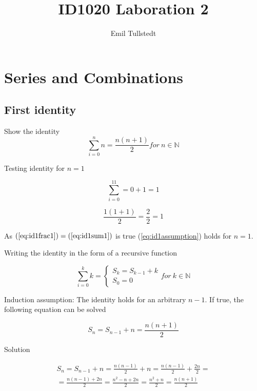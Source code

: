\documentclass[a4paper,11pt]{article}
\title{ID1020 Laboration 2}
\author{Emil Tullstedt}
\begin{document}
\maketitle

\newpage

\tableofcontents

\newpage

\section{Series and Combinations}
\label{sec:sac}

\subsection{First identity}

Show the identity
\begin{equation} \label{eq:id1assumption}
\sum_{i=0}^nn = \frac{n(n+1)}{2} for\ n \in \mathbb{N}
\end{equation}

Testing identity for $n = 1$

\begin{equation} \label{eq:id1sum1}
\sum_{i=0}^11 = 0 + 1 = 1
\end{equation}

\begin{equation} \label{eq:id1frac1}
\frac{1(1+1)}{2} = \frac{2}{2} = 1
\end{equation}

As $(\ref{eq:id1frac1}) = (\ref{eq:id1sum1})$ is true (\ref{eq:id1assumption}) holds for $n = 1$.

Writing the identity in the form of a recursive function

\begin{equation}
\sum_{i=0}^kk = 
	\begin{cases}
		S_k = S_{k-1} + k\\
		S_0 = 0
	\end{cases} for\ k \in \mathbb{N}
\end{equation}

Induction assumption: The identity holds for an arbitrary $n-1$.
If true, the following equation can be solved

\begin{equation}
S_n = S_{n-1} + n = \frac{n(n + 1)}{2}
\end{equation}

Solution

\begin{equation}
\begin{split}
S_n = S_{n-1} + n = \frac{n(n-1)}{2} + n = \frac{n(n-1)}{2} + \frac{2n}{2} = \\ = \frac{n(n-1) + 2n}{2} = \frac{n^2-n + 2n}{2} = \frac{n^2 + n}{2} = \frac{n(n + 1)}{2}
\end{split}
\end{equation}
\end{document}

